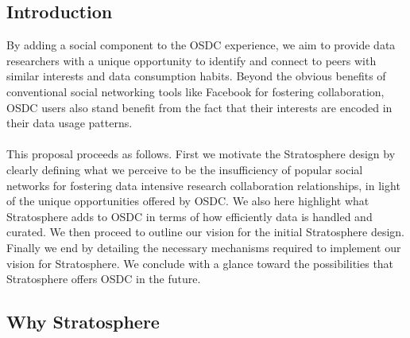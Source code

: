 \tableofcontents
\newpage
\begin{multicols*}{2}

\section{Introduction}
\label{sec:intro}

By adding a social component to the OSDC experience, we aim to provide
data researchers with a unique opportunity to identify and connect to
peers with similar interests and data consumption habits. Beyond the
obvious benefits of conventional social networking tools like Facebook
for fostering collaboration, OSDC users also stand benefit from the
fact that their interests are encoded in their data usage patterns.
\\
\\
This proposal proceeds as follows. First we motivate
the Stratosphere design by clearly defining what we perceive to be the
insufficiency of popular social networks for fostering data intensive
research collaboration relationships, in light of the unique
opportunities offered by OSDC. We also here highlight what
Stratosphere adds to OSDC in terms of how efficiently data is handled
and curated. We then proceed to outline our
vision for the initial Stratosphere design. Finally we end by
detailing the necessary mechanisms required to implement our
vision for Stratosphere. We conclude with a glance toward the
possibilities that Stratosphere offers OSDC in the future. 

\subsection{Why Stratosphere}
\label{sec:why}


\end{multicols*}
